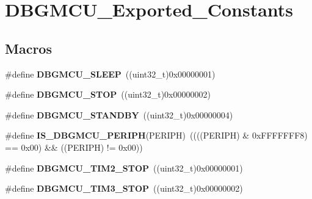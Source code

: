 \hypertarget{group___d_b_g_m_c_u___exported___constants}{\section{D\-B\-G\-M\-C\-U\-\_\-\-Exported\-\_\-\-Constants}
\label{group___d_b_g_m_c_u___exported___constants}
}
\subsection*{Macros}
\begin{DoxyCompactItemize}
\item 
\hypertarget{group___d_b_g_m_c_u___exported___constants_ga1c457289646b9d9814b93fbb994c9930}{\#define {\bfseries D\-B\-G\-M\-C\-U\-\_\-\-S\-L\-E\-E\-P}~((uint32\-\_\-t)0x00000001)}\label{group___d_b_g_m_c_u___exported___constants_ga1c457289646b9d9814b93fbb994c9930}

\item 
\hypertarget{group___d_b_g_m_c_u___exported___constants_ga4a71bcfa6868672674b5410d2fd372f4}{\#define {\bfseries D\-B\-G\-M\-C\-U\-\_\-\-S\-T\-O\-P}~((uint32\-\_\-t)0x00000002)}\label{group___d_b_g_m_c_u___exported___constants_ga4a71bcfa6868672674b5410d2fd372f4}

\item 
\hypertarget{group___d_b_g_m_c_u___exported___constants_ga6eb848845f9207ffdccd0590da192002}{\#define {\bfseries D\-B\-G\-M\-C\-U\-\_\-\-S\-T\-A\-N\-D\-B\-Y}~((uint32\-\_\-t)0x00000004)}\label{group___d_b_g_m_c_u___exported___constants_ga6eb848845f9207ffdccd0590da192002}

\item 
\hypertarget{group___d_b_g_m_c_u___exported___constants_ga96d44dc7861b6a3f364942704f323a45}{\#define {\bfseries I\-S\-\_\-\-D\-B\-G\-M\-C\-U\-\_\-\-P\-E\-R\-I\-P\-H}(P\-E\-R\-I\-P\-H)~((((P\-E\-R\-I\-P\-H) \& 0x\-F\-F\-F\-F\-F\-F\-F8) == 0x00) \&\& ((\-P\-E\-R\-I\-P\-H) != 0x00))}\label{group___d_b_g_m_c_u___exported___constants_ga96d44dc7861b6a3f364942704f323a45}

\item 
\hypertarget{group___d_b_g_m_c_u___exported___constants_ga8ba3a77260f748793c903468a4608bd1}{\#define {\bfseries D\-B\-G\-M\-C\-U\-\_\-\-T\-I\-M2\-\_\-\-S\-T\-O\-P}~((uint32\-\_\-t)0x00000001)}\label{group___d_b_g_m_c_u___exported___constants_ga8ba3a77260f748793c903468a4608bd1}

\item 
\hypertarget{group___d_b_g_m_c_u___exported___constants_ga28c01c2c30bed78e51d997007986fac9}{\#define {\bfseries D\-B\-G\-M\-C\-U\-\_\-\-T\-I\-M3\-\_\-\-S\-T\-O\-P}~((uint32\-\_\-t)0x00000002)}\label{group___d_b_g_m_c_u___exported___constants_ga28c01c2c30bed78e51d997007986fac9}


\end{DoxyCompactItemize}

